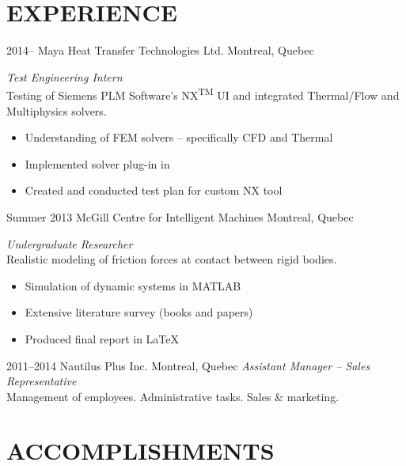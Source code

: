 
\section{EXPERIENCE}

\begin{entrylist}
\entry
{2014--}
{Maya Heat Transfer Technologies Ltd.}
{Montreal, Quebec}
{\emph{Test Engineering Intern} \\
Testing of Siemens PLM Software’s NX\textsuperscript{\scriptsize TM} UI and integrated Thermal/Flow and Multiphysics solvers.
\begin{itemize}
\item Understanding of FEM solvers -- specifically CFD and Thermal
\item Implemented solver plug-in in \CC
\item Created and conducted test plan for custom NX tool 
\end{itemize}}
\entry
{\small{Summer} 2013}
{McGill Centre for Intelligent Machines}
{Montreal, Quebec}
{\emph{Undergraduate Researcher} \\
Realistic modeling of friction forces at contact between rigid bodies.
\begin{itemize}
\item Simulation of dynamic systems in MATLAB
\item Extensive literature survey (books and papers)
\item Produced final report in \LaTeX{}
\end{itemize}}
\entry
{2011--2014}
{Nautilus Plus Inc.}
{Montreal, Quebec}
{\emph{Assistant Manager -- Sales Representative} \\
Management of employees. Administrative tasks. Sales \& marketing.}
\end{entrylist}


\section{ACCOMPLISHMENTS}


